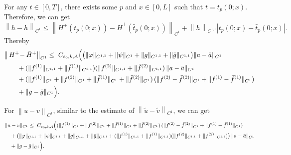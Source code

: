 \documentclass[a4paper,reqno,11pt]{amsart}
\numberwithin{equation}{section} %
\begin{document}
For any $t\in [0,T]$, there exists some $p$ and $x\in [0,L]$ such that $t=t_p(0;x)$. Therefore, we can get
$$
\left\| h-\bar{h} \right\| _{C^1}\le \left\| H^+\left( t_p(0;x) \right) -\bar{H}^+\left( \bar{t}_p(0;x) \right) \right\| _{C^1}+\left\| h \right\| _{C^{1,1}}\left| t_p(0;x)-\bar{t}_p(0;x) \right|.
$$
Thereby
\[
\begin{aligned}
&\bigl\|\,H^+\!-\bar H^+\!\,\bigr\|_{C^{1}}
\le{}\ C_{\varepsilon_0,k,A}\Bigl(
	\bigl(\|\varphi\|_{C^{1,1}}+\|\psi\|_{C^{1}}
     + \|g\|_{C^{1,1}}+\|\bar g\|_{C^{1,1}}\bigr)\|a-\bar a\|_{C^{1}}
 \\
&\qquad
     + (\|f^{(1)}\|_{C^{1,1}}+\|\bar f^{(1)}\|_{C^{1,1}})
       (\|f^{(2)}\|_{C^{1,1}}+\|\bar f^{(2)}\|_{C^{1,1}})\,
    \|a-\bar a\|_{C^{1}} \\
&\qquad
	 + (\|f^{(1)}\|_{C^{1}}+\|f^{(2)}\|_{C^{1}}
   +\|\bar f^{(1)}\|_{C^{1}}+\|\bar f^{(2)}\|_{C^{1}})\,
  (\|f^{(2)}-\bar f^{(2)}\|_{C^{1}}
   +\|f^{(1)}-\bar f^{(1)}\|_{C^{1}})\\
&\qquad
  + \|g-\bar g\|_{C^{1}}
\Bigr).
\end{aligned}
\]

For $\left\| u-v \right\| _{C^1}$, similar to the estimate of $\left\| \tilde{u}-\tilde{v} \right\| _{C^1}$, we can get
\[
\begin{aligned}
&\|u-v\|_{C^{1}}
\le{}\ C_{\varepsilon_0,k,A}\Bigl(
  (\|f^{(1)}\|_{C^{1}}+\|f^{(2)}\|_{C^{1}}
   +\|\bar f^{(1)}\|_{C^{1}}+\|\bar f^{(2)}\|_{C^{1}})\,
  (\|f^{(2)}-\bar f^{(2)}\|_{C^{1}}
   +\|f^{(1)}-\bar f^{(1)}\|_{C^{1}}) \\
&\quad + \bigl(\|\varphi\|_{C^{1,1}}+\|\psi\|_{C^{1,1}}
   + \|g\|_{C^{1,1}}+\|\bar g\|_{C^{1,1}}
   + (\|f^{(1)}\|_{C^{1,1}}+\|\bar f^{(1)}\|_{C^{1,1}})
     (\|f^{(2)}\|_{C^{1,1}}+\|\bar f^{(2)}\|_{C^{1,1}})\bigr)\,
   \|a-\bar a\|_{C^{1}} \\
&\quad + \|g-\bar g\|_{C^{1}}
\Bigr).
\end{aligned}
\]
\end{document}
